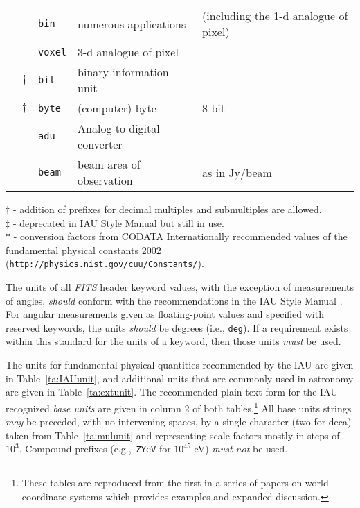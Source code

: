 \documentclass[11pt,makeidx]{book}     %
\begin{document}
\begin{table*}[tbp]
\begin{center}
\begin{tabular}{lclll}
               &      & \verb+bin+   & numerous applications 
                      &  (including the 1-d analogue of pixel) \\
               &      & \verb+voxel+ & 3-d analogue of pixel & \\
               &$\dag$& \verb+bit+   & binary information unit & \\
               &$\dag$& \verb+byte+  & (computer) byte & 8 bit \\
               &      & \verb+adu+   & Analog-to-digital converter & \\
               &      & \verb+beam+  & beam area of observation & 
                                       as in Jy/beam\\ 
\end{tabular}
\end{center}
$\dag$ - addition of prefixes for decimal multiples and submultiples
     are allowed.\\ 
$\ddag$ - deprecated  in IAU Style Manual \cite{mcnally88} but
     still in use. \\
$*$ - conversion factors from CODATA Internationally recommended
     values of the fundamental physical constants 2002 
     ({\tt http://physics.nist.gov/cuu/Constants/}).
\vspace{10pt}
\label{ta:extunit}
\end{table*}

 The units of all {\em FITS\/} header keyword values, with 
 the exception of measurements of angles, {\em should} 
 conform with the recommendations in the IAU Style 
 Manual \cite{mcnally88}. For angular 
 measurements given as floating-point values 
 and specified with reserved keywords, the units {\em should} be degrees
 (i.e., {\tt deg}). If a requirement exists within this standard for the 
 units of a keyword, then those units {\em must} be used.
 
 The units for fundamental physical quantities recommended by the 
 IAU are given in Table~\ref{ta:IAUunit}, and additional units that are 
 commonly used in astronomy are given in Table~\ref{ta:extunit}. 
The recommended plain text form for the IAU-recognized 
\textit{base units} are given in column 2 of both tables.\footnote[1]{These 
tables are reproduced from the first 
in a series of papers on world coordinate systems \cite{greisen02} which provides 
examples and expanded discussion.}
%
All base units strings {\em may} be preceded, with no intervening spaces, 
by a single character (two for deca) taken from Table~\ref{ta:mulunit} 
and representing scale factors mostly in steps of $10^3$. Compound 
prefixes (e.g.,~\verb+ZYeV+ for $10^{45}$ eV) {\em must not} be used.  
\end{document}
